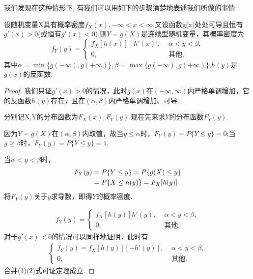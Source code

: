 我们发现在这种情形下, 有我们可以用如下的步骤清楚地表述我们所做的事情: 

\begin{theorem}
  设随机变量X具有概率密度$f_X(x),-\infty < x < \infty$,又设函数g(x)处处可导且恒有$g'(x)>0$(或恒有$g'(x)<0$),则$Y = g(X)$是连续型随机变量，其概率密度为
  \begin{equation*}
      f_Y(y)=
      \begin{cases}
          \displaystyle f_X[h(x)]\mid h'(x)\mid,\,\, &\alpha<y<\beta,\\
          \displaystyle 0,\,\, &\text{其他},
      \end{cases}
  \end{equation*}
  其中$\alpha = \min\{g(-\infty),g(+\infty)\},\beta = \max\{g(-\infty),g(+\infty)\}$,$h(y)$是$g(x)$的反函数.
\end{theorem}

\begin{proof}
  我们只证$g'(x)>0$的情况，此时$g(x)$在$(-\infty,\infty)$内严格单调增加，它的反函数$h(y)$存在，且在$(\alpha,\beta)$内严格单调增加、可导.
    
分别记X,Y的分布函数为$F_X(x),F_Y(y)$.现在先来求$Y$的分布函数$F_Y(y)$.
 
因为$Y = g(X)$在$(\alpha,\beta)$内取值，故当$y \leq \alpha$时，$F_Y(y) = P\{Y \leq y\} = 0$;当$y \geq \beta$时，$F_Y(y) = P\{Y \leq y\} = 1$.
 
 当$\alpha < y < \beta$时，
 $$
 \begin{aligned}
     \small F_Y(y) &= P\{Y \leq y\} = P\{g(X) \leq y\}\\
     \small &= P\{X \leq h(y)\} = F_X[h(y)]
 \end{aligned}
$$
将$F_Y(y)$关于$y$求导数，即得$Y$的概率密度.

\begin{align}
  f_Y(y) =
  \begin{cases}
      \displaystyle f_X[h(y)]h'(y),\,\,  &\alpha < y < \beta,\\
      \displaystyle 0,\,\,  &\text{其他}.
  \end{cases}
\end{align}
对于$g'(x)<0$的情况可以同样地证明，此时有
\begin{align}
  \begin{cases}
      f_Y(y)=
      \displaystyle f_X[h(y)][-h'(y)],\,\, &\alpha < y < \beta,\\
      \displaystyle 0,\,\, &\text{其他}.
  \end{cases}
\end{align}
合并(1)(2)式可证定理成立.
\end{proof}

